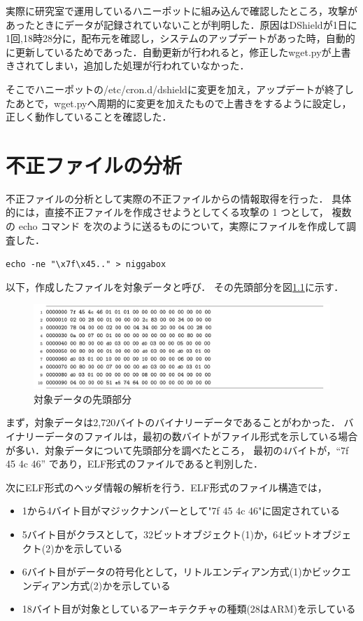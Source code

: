 \documentclass[dvipdfmx]{bta}
\begin{document}
実際に研究室で運用しているハニーポットに組み込んで確認したところ，攻撃があったときにデータが記録されていないことが判明した．原因はDShieldが1日に1回,18時28分に，配布元を確認し，システムのアップデートがあった時，自動的に更新しているためであった．自動更新が行われると，修正したwget.pyが上書きされてしまい，追加した処理が行われていなかった．

そこでハニーポットの/etc/cron.d/dshieldに変更を加え，アップデートが終了したあとで，wget.pyへ周期的に変更を加えたもので上書きをするように設定し，正しく動作していることを確認した．

\chapter{不正ファイルの分析}
不正ファイルの分析として実際の不正ファイルからの情報取得を行った．
具体的には，直接不正ファイルを作成させようとしてくる攻撃の 1 つとして，
複数の echo コマンド を次のように送るものについて，実際にファイルを作成して調査した．

\verb!echo -ne "\x7f\x45.." > niggabox!

以下，作成したファイルを対象データと呼び． その先頭部分を図\ref{fig:textcmds}に示す．

\begin{figure}[htbp]
	\centering
 	\includegraphics[scale = 0.75]{niggabox.png}
 	\caption{対象データの先頭部分}\label{fig:textcmds}
\end{figure}
まず，対象データは2,720バイトのバイナリーデータであることがわかった．
バイナリーデータのファイルは，最初の数バイトがファイル形式を示している場合が多い．対象データについて先頭部分を調べたところ，
最初の4バイトが，“7f 45 4c 46” であり，ELF形式\cite{elf}のファイルであると判別した．

次にELF形式のヘッダ情報の解析を行う．ELF形式のファイル構造では，

\begin{itemize}
	\item 1から4バイト目がマジックナンバーとして"7f 45 4c 46"に固定されている
	\item 5バイト目がクラスとして，32ビットオブジェクト(1)か，64ビットオブジェクト(2)かを示している
	\item 6バイト目がデータの符号化として，リトルエンディアン方式(1)かビックエンディアン方式(2)かを示している
	\item 18バイト目が対象としているアーキテクチャの種類(28はARM)を示している
	
  \end{itemize}
\end{document}
